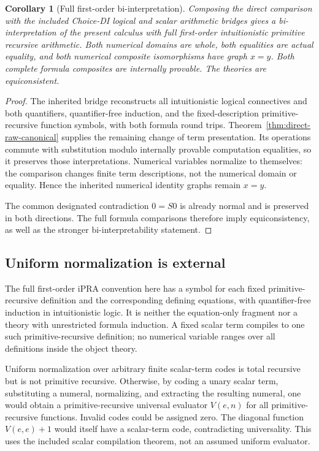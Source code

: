 \documentclass[11pt,a4paper]{article}
\newtheorem{corollary}[theorem]{Corollary}
\theoremstyle{definition}\newtheorem{definition}[theorem]{Definition}
\theoremstyle{remark}\newtheorem{remark}[theorem]{Remark}
\begin{document}
\begin{corollary}[Full first-order bi-interpretation]
\label{cor:nb-full-ipra}
Composing the direct comparison with the included Choice-DI logical and
scalar arithmetic bridges gives a bi-interpretation of the present
calculus with full first-order intuitionistic primitive recursive
arithmetic. Both numerical domains are whole, both equalities are
actual equality, and both numerical composite isomorphisms have graph
$x=y$. Both complete formula composites are internally provable.
The theories are equiconsistent.
\end{corollary}
\begin{proof}
The inherited bridge reconstructs all intuitionistic logical
connectives and both quantifiers, quantifier-free induction, and the
fixed-description primitive-recursive function symbols, with both
formula round trips. Theorem~\ref{thm:direct-raw-canonical} supplies
the remaining change of term presentation. Its operations commute
with substitution modulo internally provable computation equalities,
so it preserves those interpretations. Numerical variables normalize
to themselves: the comparison changes finite term descriptions,
not the numerical domain or equality. Hence the inherited numerical
identity graphs remain $x=y$.

The common designated contradiction $0=S0$ is already normal and
is preserved in both directions. The full formula comparisons
therefore imply equiconsistency, as well as the stronger
bi-interpretability statement.
\end{proof}

\subsection{Uniform normalization is external}

The full first-order iPRA convention here has a symbol for each fixed
primitive-recursive definition and the corresponding defining
equations, with quantifier-free induction in intuitionistic logic.
It is neither the equation-only fragment nor a theory with unrestricted
formula induction. A fixed scalar term compiles to one such
primitive-recursive definition; no numerical variable ranges over all
definitions inside the object theory.

Uniform normalization over arbitrary finite scalar-term codes is total
recursive but is not primitive recursive. Otherwise, by coding a unary
scalar term, substituting a numeral, normalizing, and extracting the
resulting numeral, one would obtain a primitive-recursive universal
evaluator $V(e,n)$ for all primitive-recursive functions. Invalid codes
could be assigned zero. The diagonal function $V(e,e)+1$ would itself
have a scalar-term code, contradicting universality. This uses the
included scalar compilation theorem, not an assumed uniform evaluator.
\end{document}
